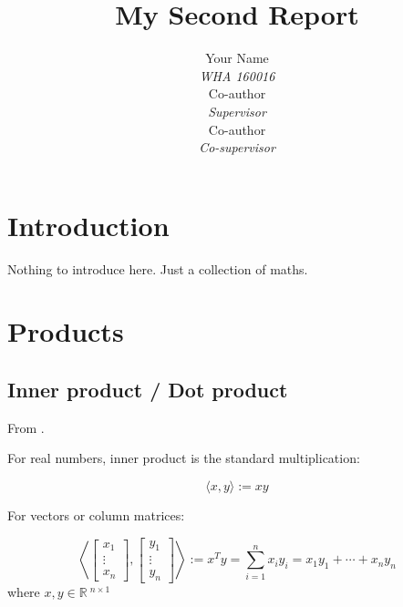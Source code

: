 \documentclass{article}
\title{My Second Report}
\author{Your Name \\ \textit{WHA 160016} \\ \AND
        Co-author \\ \textit{Supervisor} \\ \AND
        Co-author \\ \textit{Co-supervisor}}
\begin{document}
\maketitle




\section{Introduction}
\label{sec: Introduction}

Nothing to introduce here. Just a collection of maths.





\section{Products}
\label{sec: Products}

\subsection{Inner product / Dot product}
\label{subsec: Inner product}

From \cite{wiki2019innerProd,wiki2019dotProd,wiki2019cosineSim}.

For real numbers, inner product is the standard multiplication:

\begin{equation}
    \langle x, y\rangle := x y
\end{equation}

For vectors or column matrices:

\begin{equation}
    \left\langle\left[ \begin{array}{c}{ x_{1}} \\ {\vdots} \\ {x_{n}}\end{array}\right], \left[ \begin{array}{c}{y_{1}} \\ {\vdots} \\ {y_{n}}\end{array}\right]\right\rangle := x^{T} y=\sum_{i=1}^{n} x_{i} y_{i}=x_{1} y_{1}+\cdots+x_{n} y_{n}
\end{equation}
\noindent
where $x, y \in\mathbb{R}\:^{n \times 1}$
\end{document}
